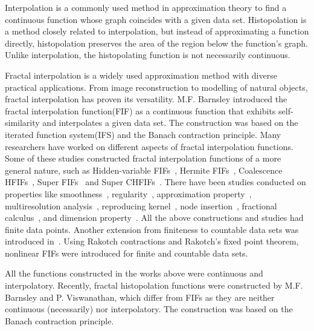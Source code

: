 \documentclass[sn-mathphys-num]{sn-jnl}
\numberwithin{equation}{section}
\begin{document}
Interpolation is a commonly used method in approximation theory to find a continuous function whose graph coincides with a given data set. Histopolation is a method closely related to interpolation, but instead of approximating a function directly, histopolation preserves the area of the region below the function's graph. Unlike interpolation, the histopolating function is not necessarily continuous.

Fractal interpolation is a widely used approximation method with diverse practical applications. From image reconstruction to modelling of natural objects, fractal interpolation has proven its versatility. M.F. Barnsley introduced the fractal interpolation function(FIF) as a continuous function that exhibits self-similarity and interpolates a given data set\cite {barn1986}. The construction was based on the iterated function system(IFS) and the Banach contraction principle. Many researchers have worked on different aspects of fractal interpolation functions. Some of these studies constructed fractal interpolation functions of a more general nature, such as Hidden-variable FIFs~\cite{barnsley89_2}, Hermite FIFs~\cite{navas-sebas04}, Coalescence HFIFs~\cite{chand07}, Super FIFs~\cite{srijanani15} and Super CHFIFs~\cite{srijanani21}. There have been studies conducted on properties like smoothness~\cite{gang96}, regularity~\cite{ srijanani13_2}, approximation property~\cite{navascues03,srijanani14_1}, multiresolution analysis~\cite{hardin92,srijanani14_2}, reproducing kernel~\cite{bouboulis11,srijanani19}, node insertion~\cite{kocic03,srijanani13_1}, fractional calculus~\cite{pan14,srijanani17}, and dimension property~\cite{ruan09}. All the above constructions and studies had finite data points. Another extension from finiteness to countable data sets was introduced in~\cite{secelean2003fractal}. Using Rakotch contractions and Rakotch's fixed point theorem, nonlinear FIFs were introduced for finite\cite{ri2018new} and countable data sets\cite{pacurar2021countable}. %
	
All the functions constructed in the works above were continuous and interpolatory. Recently, fractal histopolation functions were constructed by M.F. Barnsley and P. Viswanathan, which differ from FIFs as they are neither continuous (necessarily) nor  interpolatory\cite{barnsley2023histopolating}. The construction was based on the Banach contraction principle.
	
\end{document}
